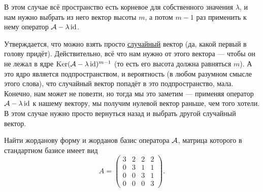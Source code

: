 В этом случае всё пространство есть корневое для собственного значения $\lambda$, и нам нужно выбрать из него вектор высоты $m$, а потом $m - 1$ раз применить к нему оператор $\mathcal{A} - \lambda\operatorname{id}$.

Утверждается, что можно взять просто \underline{случайный} вектор (да, какой первый в голову придёт). Действительно, всё что нам нужно от этого вектора --- чтобы он не лежал в ядре $\operatorname{Ker}(\mathcal{A} - \lambda\operatorname{id})^{m - 1}$ (то есть его высота должна равняться $m$). А это ядро является подпространством, и вероятность (в любом разумном смысле этого слова), что случайный вектор попадёт в это подпространство, мала. Конечно, нам может не повезти, но тогда мы это заметим --- применяя оператор $\mathcal{A} - \lambda\operatorname{id}$ к нашему вектору, мы получим нулевой вектор раньше, чем того хотели. В этом случае нужно просто вернуться назад и выбрать другой случайный вектор.

\begin{problem}
	Найти жорданову форму и жорданов базис оператора $\mathcal{A}$, матрица которого в стандартном базисе имеет вид
	\[
		A = \begin{pmatrix}
			3 & 2 & 2 & 2\\
			0 & 3 & 1 & 1\\
			0 & 0 & 3 & 1\\
			0 & 0 & 0 & 3
		\end{pmatrix}.
	\]
\end{problem}

